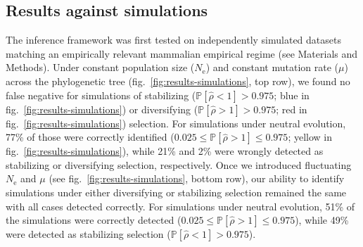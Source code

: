 \documentclass{article}
\newcommand{\Ne}{N_{\text{e}}}
\newcommand{\proba}{\mathbb{P}}
\newcommand{\MutationRate}{\mu}
\newcommand{\EstNI}{\widehat{\rho}}
\begin{document}
\subsection*{Results against simulations}\label{subsec:results-against-simulations}

The inference framework was first tested on independently simulated datasets matching an empirically relevant mammalian empirical regime (see Materials and Methods).
Under constant population size ($\Ne$) and constant mutation rate ($\MutationRate$) across the phylogenetic tree (fig.~\ref{fig:results-simulations}, top row), we found no false negative for simulations of stabilizing ($\proba [\EstNI < 1] > 0.975$; blue in fig.~\ref{fig:results-simulations}) or diversifying ($\proba [\EstNI > 1] > 0.975$; red in fig.~\ref{fig:results-simulations}) selection.
For simulations under neutral evolution, 77\% of those were correctly identified ($0.025 \leq \proba [\EstNI > 1] \leq 0.975$; yellow in fig.~\ref{fig:results-simulations}), while 21\% and 2\% were wrongly detected as stabilizing or diversifying selection, respectively.
Once we introduced fluctuating $\Ne$ and $\MutationRate$ (see fig.~\ref{fig:results-simulations}, bottom row), our ability to identify simulations under either diversifying or stabilizing selection remained the same with all cases detected correctly.
For simulations under neutral evolution, 51\% of the simulations were correctly detected ($0.025 \leq \proba [\EstNI > 1] \leq 0.975$), while 49\% were detected as stabilizing selection ($\proba [\EstNI < 1] > 0.975$).
\end{document}
